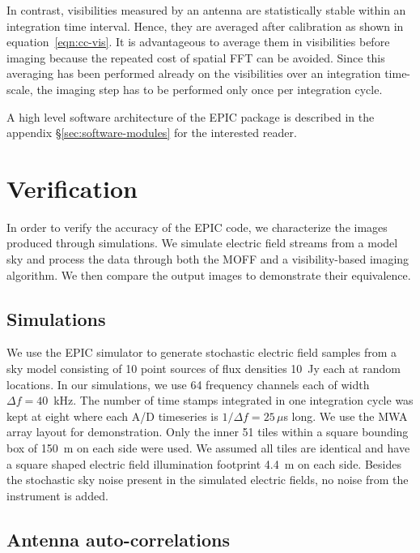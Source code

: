 \documentclass[a4paper,fleqn,usenatbib]{mnras}
\begin{document}
In contrast, visibilities measured by an antenna are statistically stable within
an integration time interval. Hence, they are averaged after calibration as shown
in equation~\ref{eqn:cc-vis}. It is advantageous to average them in visibilities
before imaging because the repeated cost of spatial FFT can be avoided. Since 
this averaging has been performed already on the visibilities over an integration 
time-scale, the imaging step has to be performed only once per integration cycle. 

A high level software architecture of the EPIC package is described in the 
appendix \S\ref{sec:software-modules} for the interested reader.

\section{Verification}\label{sec:verify}

In order to verify the accuracy of the EPIC code, we characterize the images 
produced through simulations. We simulate electric field streams from a model 
sky and process the data through both the MOFF and a visibility-based imaging 
algorithm. We then compare the output images to demonstrate their equivalence.

\subsection{Simulations}\label{sec:sim}

We use the EPIC simulator to generate stochastic electric field samples from a 
sky model consisting of 10 point sources of flux densities 10~Jy each at random 
locations. In our simulations, we use 64 frequency channels each of width 
$\Delta f = 40$~kHz. The number of time stamps integrated in one integration 
cycle was kept at eight where each A/D timeseries is $1/\Delta f=25\,\mu$s long. 
We use the MWA array layout \citep{bea12} for demonstration. Only the inner 51 
tiles within a square bounding box of 150~m on each side were used. We assumed 
all tiles are identical and have a square shaped electric field illumination 
footprint 4.4~m on each side. Besides the stochastic sky noise present in the 
simulated electric fields, no noise from the instrument is added.

\subsection{Antenna auto-correlations}\label{sec:rm-autocorr}
\end{document}
